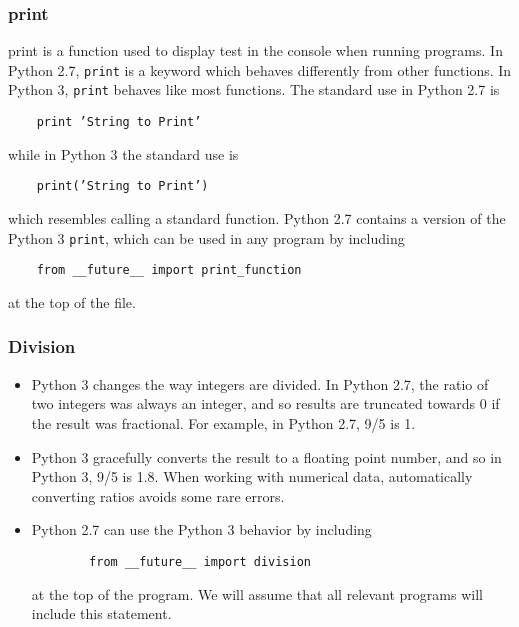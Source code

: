 \documentclass[KSmain.tex]{subfiles}
\begin{document}
\subsubsection*{print}
print is a function used to display test in the console when running programs. In Python 2.7, \texttt{print} is a
keyword which behaves differently from other functions. In Python 3, \texttt{print} behaves like most functions.
The standard use in Python 2.7 is
\begin{framed}
	\begin{verbatim}
	print ’String to Print’
	\end{verbatim}
\end{framed}
while in Python 3 the standard use is
\begin{framed}
	\begin{verbatim}
	print(’String to Print’)
	\end{verbatim}
\end{framed}
which resembles calling a standard function. Python 2.7 contains a version of the Python 3 \texttt{print}, which
can be used in any program by including
\begin{framed}
	\begin{verbatim}
	from __future__ import print_function
	\end{verbatim}
\end{framed}
at the top of the file. 
\subsubsection*{Division}
\begin{itemize}
	\item Python 3 changes the way integers are divided. In Python 2.7, the ratio of two integers was always an
	integer, and so results are truncated towards 0 if the result was fractional. For example, in Python 2.7, 9/5
	is 1. 
	\item Python 3 gracefully converts the result to a floating point number, and so in Python 3, 9/5 is 1.8. When
	working with numerical data, automatically converting ratios avoids some rare errors.
	\item Python 2.7 can use
	the Python 3 behavior by including
	\begin{framed}
		\begin{verbatim}
		from __future__ import division
		\end{verbatim}
	\end{framed}
	at the top of the program. We will assume that all relevant programs will include this statement.
\end{itemize}
\end{document}
